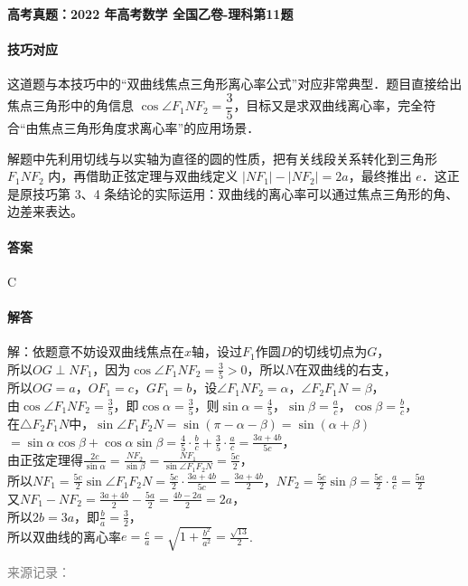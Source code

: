 \documentclass[UTF8,a4paper,11pt]{ctexart}
\newenvironment{gaokao}[1]{\par\medskip\noindent\textbf{高考真题：#1}\par\smallskip}{\par\medskip}
\begin{document}
\begin{gaokao}{2022 年高考数学 全国乙卷-理科第11题}
\paragraph{技巧对应}

这道题与本技巧中的“双曲线焦点三角形离心率公式”对应非常典型．题目直接给出焦点三角形中的角信息 $\cos\angle F_1NF_2=\dfrac35$，目标又是求双曲线离心率，完全符合“由焦点三角形角度求离心率”的应用场景．

解题中先利用切线与以实轴为直径的圆的性质，把有关线段关系转化到三角形 $F_1NF_2$ 内，再借助正弦定理与双曲线定义 $|NF_1|-|NF_2|=2a$，最终推出 $e$．这正是原技巧第 3、4 条结论的实际运用：双曲线的离心率可以通过焦点三角形的角、边差来表达。

\paragraph{答案}

C

\paragraph{解答}

解：依题意不妨设双曲线焦点在$x$轴，设过$F_1$作圆$D$的切线切点为$G$，\\所以$OG \perp NF_1$，因为$\cos\angle F_1NF_2 = \frac{3}{5} > 0$，所以$N$在双曲线的右支，\\所以$OG = a$，$OF_1 = c$，$GF_1 = b$，设$\angle F_1NF_2 = \alpha$，$\angle F_2F_1N = \beta$，\\由$\cos\angle F_1NF_2 = \frac{3}{5}$，即$\cos\alpha = \frac{3}{5}$，则$\sin\alpha = \frac{4}{5}$，$\sin\beta = \frac{a}{c}$，$\cos\beta = \frac{b}{c}$，\\在$\triangle F_2F_1N$中，$\sin\angle F_1F_2N = \sin(\pi-\alpha-\beta) = \sin(\alpha+\beta)$\\$= \sin\alpha\cos\beta + \cos\alpha\sin\beta = \frac{4}{5}\cdot\frac{b}{c} + \frac{3}{5}\cdot\frac{a}{c} = \frac{3a+4b}{5c}$，\\由正弦定理得$\frac{2c}{\sin\alpha} = \frac{NF_2}{\sin\beta} = \frac{NF_1}{\sin\angle F_1F_2N} = \frac{5c}{2}$，\\所以$NF_1 = \frac{5c}{2}\sin\angle F_1F_2N = \frac{5c}{2}\cdot\frac{3a+4b}{5c} = \frac{3a+4b}{2}$，$NF_2 = \frac{5c}{2}\sin\beta = \frac{5c}{2}\cdot\frac{a}{c} = \frac{5a}{2}$\\又$NF_1 - NF_2 = \frac{3a+4b}{2} - \frac{5a}{2} = \frac{4b-2a}{2} = 2a$，\\所以$2b = 3a$，即$\frac{b}{a} = \frac{3}{2}$，\\所以双曲线的离心率$e = \frac{c}{a} = \sqrt{1+\frac{b^2}{a^2}} = \frac{\sqrt{13}}{2}$.

\par\smallskip\textcolor{gray}{\footnotesize 来源记录：\texttt{}}

\end{gaokao}
\end{document}
